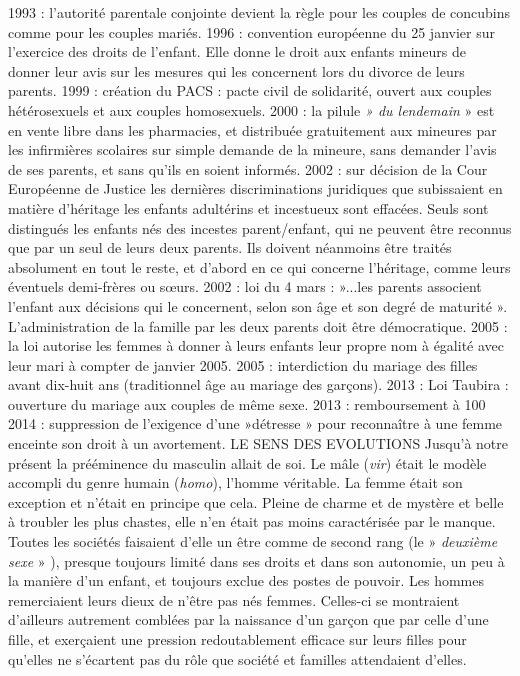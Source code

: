  1993 : l'autorité parentale conjointe devient la règle pour les couples de concubins comme pour les couples mariés.
 1996 : convention européenne du 25 janvier sur l'exercice des droits de l'enfant. Elle donne le droit aux enfants mineurs de donner leur avis sur les mesures qui les concernent lors du divorce de leurs parents.
 1999 : création du PACS : pacte civil de solidarité, ouvert aux couples hétérosexuels et aux couples homosexuels.
 2000 : la pilule\emph{ » du lendemain} » est en vente libre dans les pharmacies, et distribuée gratuitement aux mineures par les infirmières scolaires sur simple demande de la mineure, sans demander l'avis de ses parents, et sans qu'ils en soient informés.
 2002 : sur décision de la Cour Européenne de Justice les dernières discriminations juridiques que subissaient en matière d'héritage les enfants adultérins et incestueux sont effacées. Seuls sont distingués les enfants nés des incestes parent/enfant, qui ne peuvent être reconnus que par un seul de leurs deux parents. Ils doivent néanmoins être traités absolument en tout le reste, et d'abord en ce qui concerne l'héritage, comme leurs éventuels demi-frères ou sœurs. 
 2002 : loi du 4 mars : »...les parents associent l'enfant aux décisions qui le concernent, selon son âge et son degré de maturité ». L'administration de la famille par les deux parents doit être démocratique.
 2005 : la loi autorise les femmes à donner à leurs enfants leur propre nom à égalité avec leur mari à compter de janvier 2005. 
 2005 : interdiction du mariage des filles avant dix-huit ans (traditionnel âge au mariage des garçons).
 2013 : Loi Taubira : ouverture du mariage aux couples de même sexe.
 2013 : remboursement à 100 %
 2014 : suppression de l'exigence d'une »détresse » pour reconnaître à une femme enceinte son droit à un avortement. 
LE SENS DES EVOLUTIONS
 Jusqu'à notre présent la prééminence du masculin allait de soi. Le mâle (\emph{vir}) était le modèle accompli du genre humain (\emph{homo}), l'homme véritable. La femme était son exception et n'était en principe que cela. Pleine de charme et de mystère et belle à troubler les plus chastes, elle n'en était pas moins caractérisée par le manque. Toutes les sociétés faisaient d'elle un être comme de second rang (le » \emph{deuxième sexe} » ), presque toujours limité dans ses droits et dans son autonomie, un peu à la manière d'un enfant, et toujours exclue des postes de pouvoir. Les hommes remerciaient leurs dieux de n'être pas nés femmes. Celles-ci se montraient d'ailleurs autrement comblées par la naissance d'un garçon que par celle d'une fille, et exerçaient une pression redoutablement efficace sur leurs filles pour qu'elles ne s'écartent pas du rôle que société et familles attendaient d'elles.
